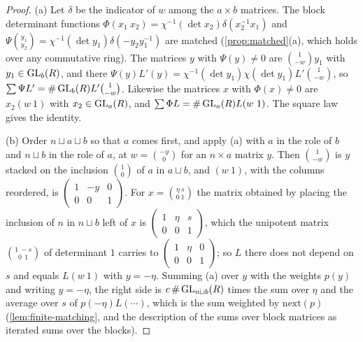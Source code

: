 \begin{proof}
(a) Let $\delta$ be the indicator of $w$ among the $a\times b$ matrices. The block determinant functions $\Phi(x_1\ x_2)=\chi^{-1}(\det x_2)\delta(x_2^{-1}x_1)$ and
$\Psi\binom{y_1}{y_2}=\chi^{-1}(\det y_1)\delta(-y_2y_1^{-1})$ are matched (\cref{prop:matched}(a), which holds over any commutative ring). The matrices $y$ with $\Psi(y)\ne0$ are $\binom1{-w}y_1$ with $y_1\in\operatorname{GL}_b(R)$, and there
$\Psi(y)L'(y)=\chi^{-1}(\det y_1)\chi(\det y_1)L'\binom1{-w}$, so $\sum\Psi L'=\#\operatorname{GL}_b(R)L'\binom1{-w}$. Likewise the matrices $x$ with $\Phi(x)\ne0$ are $x_2(w\ 1)$ with $x_2\in\operatorname{GL}_a(R)$, and $\sum\Phi L=\#\operatorname{GL}_a(R)L(w\ 1)$.
The square law gives the identity.

(b) Order $n\sqcup a\sqcup b$ so that $a$ comes first, and apply (a) with $a$ in the role of $b$ and $n\sqcup b$ in the role of $a$, at $w=\binom{-y}0$ for an $n\times a$ matrix $y$. Then $\binom1{-w}$ is $y$ stacked on
the inclusion $\binom10$ of $a$ in $a\sqcup b$, and $(w\ 1)$, with the columns reordered, is $\begin{pmatrix}1&-y&0\\0&0&1\end{pmatrix}$. For $x=\binom{\eta\ s}{0\ 1}$ the matrix obtained by placing the inclusion of $n$ in
$n\sqcup b$ left of $x$ is $\begin{pmatrix}1&\eta&s\\0&0&1\end{pmatrix}$, which the unipotent matrix $\binom{1\ -s}{0\ \ 1}$ of determinant $1$ carries to $\begin{pmatrix}1&\eta&0\\0&0&1\end{pmatrix}$; so $L$ there does not depend
on $s$ and equals $L(w\ 1)$ with $y=-\eta$. Summing (a) over $y$ with the weights $p(y)$ and writing $y=-\eta$, the right side is $c\,\#\operatorname{GL}_{n\sqcup b}(R)$ times the sum over $\eta$ and the average over $s$ of
$p(-\eta)L(\cdots)$, which is the sum weighted by $\mathrm{next}(p)$ (\cref{lem:finite-matching}, and the description of the sums over block matrices as iterated sums over the blocks).


\end{proof}
